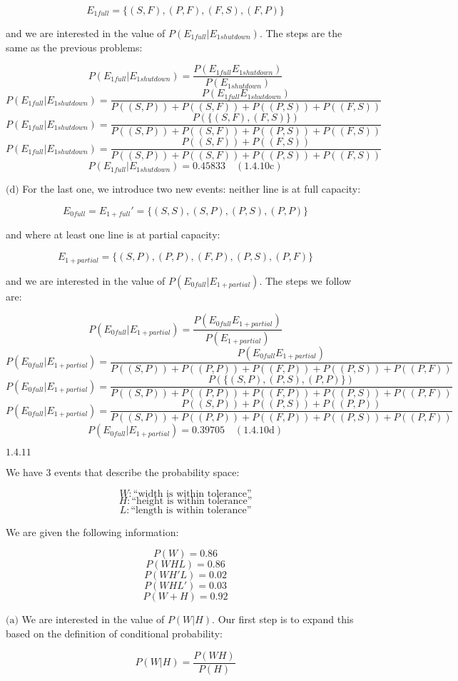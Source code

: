 \documentclass{article}
\newcommand{\problem}[2]{$\boxed{\text{#1.#2}}$}
\newcommand{\subproblem}[3]{$\boxed{\text{(#3)}}$}
\newcommand{\subsolution}[4]{\boxed{#4\quad(\text{#1.#2#3})}}
\begin{document}
\[
E_{1full}=\{(S,F),(P,F),(F,S),(F,P)\}
\]

and we are interested in the value of
$P(E_{1full}|E_{1shutdown})$. The steps are the same as the previous
problems:

\[
P(E_{1full}|E_{1shutdown})=
\dfrac{P(E_{1full}E_{1shutdown})}{P(E_{1shutdown})}
\] \[
P(E_{1full}|E_{1shutdown})=
\dfrac{P(E_{1full}E_{1shutdown})}
{P((S,P))+P((S,F))+P((P,S))+P((F,S))}
\] \[
P(E_{1full}|E_{1shutdown})=
\dfrac{P(\{(S,F),(F,S)\})}
{P((S,P))+P((S,F))+P((P,S))+P((F,S))}
\] \[
P(E_{1full}|E_{1shutdown})=
\dfrac{P((S,F))+P((F,S))}
{P((S,P))+P((S,F))+P((P,S))+P((F,S))}
\] \[
\subsolution{1.4}{10}{c}{P(E_{1full}|E_{1shutdown})=0.45833}
\]

%
\subproblem{1.4}{10}{d} For the last one, we introduce two new events:
neither line is at full capacity:

\[
E_{0full}=E_{1+full}'=\{(S,S),(S,P),(P,S),(P,P)\}
\]

and where at least one line is at partial capacity:

\[
E_{1+partial}=\{(S,P),(P,P),(F,P),(P,S),(P,F)\}
\]

and we are interested in the value of $P(E_{0full}|E_{1+partial})$. The steps we follow are:

\[
P(E_{0full}|E_{1+partial})=
\dfrac{P(E_{0full}E_{1+partial})}
{P(E_{1+partial})}
\] \[
P(E_{0full}|E_{1+partial})=
\dfrac{P(E_{0full}E_{1+partial})}
{P((S,P))+P((P,P))+P((F,P))+P((P,S))+P((P,F))}
\] \[
P(E_{0full}|E_{1+partial})=
\dfrac{P(\{(S,P),(P,S),(P,P)\})}
{P((S,P))+P((P,P))+P((F,P))+P((P,S))+P((P,F))}
\] \[
P(E_{0full}|E_{1+partial})=
\dfrac{P((S,P))+P((P,S))+P((P,P))}
{P((S,P))+P((P,P))+P((F,P))+P((P,S))+P((P,F))}
\] \[
\subsolution{1.4}{10}{d}{P(E_{0full}|E_{1+partial})=0.39705}
\]

%
\problem{1.4}{11}

We have 3 events that describe the probability space:

\[
W:\text{``width is within tolerance''}
\] \[
H:\text{``height is within tolerance''}
\] \[
L:\text{``length is within tolerance''}
\]

We are given the following information:

\[
P(W)=0.86
\] \[
P(WHL)=0.86
\] \[
P(WH'L)=0.02
\] \[
P(WHL')=0.03
\] \[
P(W+H)=0.92
\]

%
\subproblem{1.4}{11}{a} We are interested in the value of
$P(W|H)$. Our first step is to expand this based on the definition of
conditional probability:

\[
P(W|H)=\dfrac{P(WH)}{P(H)}
\]
\end{document}
